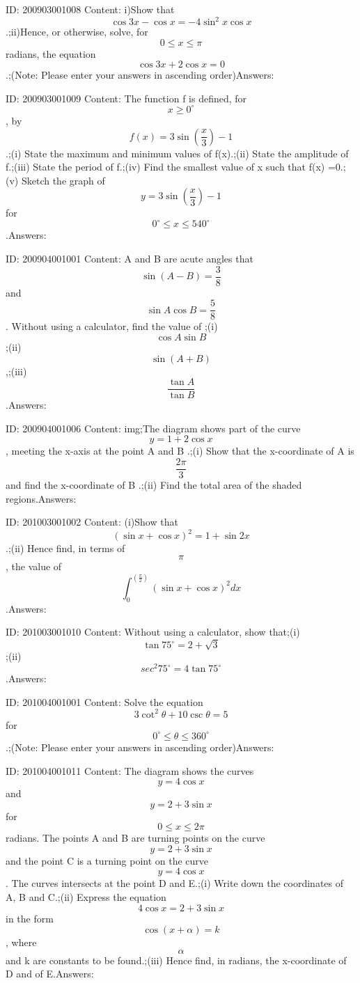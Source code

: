 \documentclass{article}
\begin{document}
ID: 200903001008
Content:
i)Show that $$\cos  3x -\cos  x = -4\sin ^2x \cos  x$$.;ii)Hence, or otherwise, solve, for $$0 \leq x \leq \pi$$ radians, the equation $$\cos 3x + 2\cos x =0$$.;(Note: Please enter your answers in ascending order)Answers:

ID: 200903001009
Content:
The function f is defined, for $$x \geq 0^{\circ}$$, by $$f(x)=3\sin (\frac{x}{3}) -1$$.;(i) State the maximum and minimum values of f(x).;(ii) State the amplitude of f.;(iii) State the period of f.;(iv) Find the smallest value of x such that f(x) =0.;(v) Sketch the graph of $$y = 3\sin (\frac{x}{3}) -1$$ for $$0^{\circ} \leq x\leq 540^{\circ}$$.Answers:

ID: 200904001001
Content:
A and B are acute angles that $$\sin  (A-B) = \frac{3}{8}$$ and $$\sin A\cos B = \frac{5}{8}$$. Without using a calculator, find the value of ;(i) $$\cos A\sin B$$;(ii) $$\sin (A+B)$$,;(iii) $$\frac{\tan A}{\tan B}$$.Answers:

ID: 200904001006
Content:
img;The diagram shows part of the curve $$y=1+2\cos x$$, meeting the  x-axis at the point A and B .;(i) Show that the x-coordinate of A is $$\frac{2\pi }{3} $$ and find the x-coordinate of B .;(ii) Find the total area of the shaded regions.Answers:

ID: 201003001002
Content:
(i)Show that $$(\sin  x+ \cos  x)^2 = 1+\sin 2x$$.;(ii) Hence find, in terms of $$\pi$$, the value of $$\int_0^{( \frac{\pi }{2})} (\sin  x+\cos x)^2 dx$$.Answers:

ID: 201003001010
Content:
Without using a calculator, show that;(i) $$\tan  75^{\circ} = 2+ \sqrt{3}$$;(ii) $$sec^2 75^{\circ} =4 \tan  75^{\circ}$$.Answers:

ID: 201004001001
Content:
Solve the equation $$3\cot^2 \theta + 10 \csc \theta =5$$ for $$0^{\circ} \leq \theta \leq 360^{\circ}$$.;(Note: Please enter your answers in ascending order)Answers:

ID: 201004001011
Content:
The diagram shows the curves $$y=4\cos x$$ and $$y=2+3\sin x$$ for $$0\leq x\leq2 \pi$$ radians. The points A and B are turning points on the curve $$y=2+3\sin x$$ and the point C is a turning point on the curve $$y=4\cos x$$. The curves intersects at the point D and E.;(i) Write down the coordinates of A, B and C.;(ii) Express the equation $$4\cos x =2+3\sin x$$ in the form $$\cos (x+ \alpha) =k$$, where $$\alpha$$ and k are constants to be found.;(iii) Hence find, in radians, the x-coordinate of D and of E.Answers:
\end{document}
